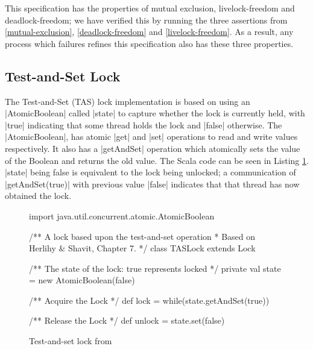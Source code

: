 This specification has the properties of mutual exclusion, livelock-freedom and deadlock-freedom; we have verified this by running the three assertions from \ref{mutual-exclusion}, \ref{deadlock-freedom} and \ref{livelock-freedom}. As a result, any process which failures refines this specification also has these three properties. 

\subsection{Test-and-Set Lock}

The Test-and-Set (TAS) lock implementation is based on using an |AtomicBoolean| called |state| to capture whether the lock is currently held, with |true| indicating that some thread holds the lock and |false| otherwise. The |AtomicBoolean|, has atomic |get| and |set| operations to read and write values respectively. It also has a |getAndSet| operation which atomically sets the value of the Boolean and returns the old value. The Scala code can be seen in Listing \ref{fig:TASScala}. |state| being false is equivalent to the lock being unlocked; a communication of |getAndSet(true)| with previous value |false| indicates that that thread has now obtained the lock. %

\begin{figure}
  \begin{scala}
  import java.util.concurrent.atomic.AtomicBoolean

  /** A lock based upon the test-and-set operation 
    * Based on Herlihy & Shavit, Chapter 7. */
  class TASLock extends Lock{
    /** The state of the lock: true represents locked */
    private val state = new AtomicBoolean(false)

    /** Acquire the Lock */ 
    def lock = while(state.getAndSet(true)){ }

    /** Release the Lock */
    def unlock = state.set(false)
  }
  \end{scala}
  \caption{Test-and-set lock from \cite{CADS} \label{fig:TASScala}}
\end{figure}

